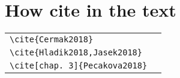 \section{How cite in the text}
\begin{center}
\begin{tabular}{l@{~~$\longrightarrow$~~}l}
\verb|\cite{Cermak2018}|&\cite{Cermak2018}\\
\verb|\cite{Hladik2018,Jasek2018}|&\cite{Hladik2018,Jasek2018}\\
\verb|\cite[chap. 3]{Pecakova2018}|&\cite[kap. 3]{Pecakova2018}\\
\end{tabular}
\end{center}
